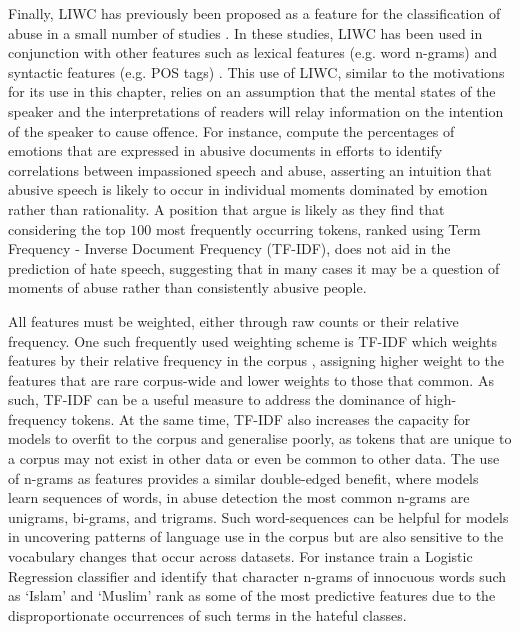 Finally, LIWC has previously been proposed as a feature for the classification of abuse in a small number of studies \citep{Nina-Alcocer:2019,Joksimovic:2019}. In these studies, LIWC has been used in conjunction with other features such as lexical features (e.g. word n-grams) and syntactic features (e.g. POS tags) \citep{Joksimovic:2019}. This use of LIWC, similar to the motivations for its use in this chapter, relies on an assumption that the mental states of the speaker and the interpretations of readers will relay information on the intention of the speaker to cause offence. For instance, \citet{Nina-Alcocer:2019} compute the percentages of emotions that are expressed in abusive documents in efforts to identify correlations between impassioned speech and abuse, asserting an intuition that abusive speech is likely to occur in individual moments dominated by emotion rather than rationality. A position that \citep{Waseem:2016} argue is likely as they find that considering the top $100$ most frequently occurring tokens, ranked using Term Frequency - Inverse Document Frequency (TF-IDF), does not aid in the prediction of hate speech, suggesting that in many cases it may be a question of moments of abuse rather than consistently abusive people.

All features must be weighted, either through raw counts or their relative frequency. One such frequently used weighting scheme is TF-IDF which weights features by their relative frequency in the corpus \citep{Fortuna:2018}, assigning higher weight to the features that are rare corpus-wide and lower weights to those that common. As such, TF-IDF can be a useful measure to address the dominance of high-frequency tokens. At the same time, TF-IDF also increases the capacity for models to overfit to the corpus and generalise poorly, as tokens that are unique to a corpus may not exist in other data or even be common to other data. The use of n-grams as features provides a similar double-edged benefit, where models learn sequences of words, in abuse detection the most common n-grams are unigrams, bi-grams, and trigrams. Such word-sequences can be helpful for models in uncovering patterns of language use in the corpus but are also sensitive to the vocabulary changes that occur across datasets. For instance \citet{Waseem-Hovy:2016} train a Logistic Regression classifier and identify that character n-grams of innocuous words such as `Islam' and `Muslim' rank as some of the most predictive features due to the disproportionate occurrences of such terms in the hateful classes.

